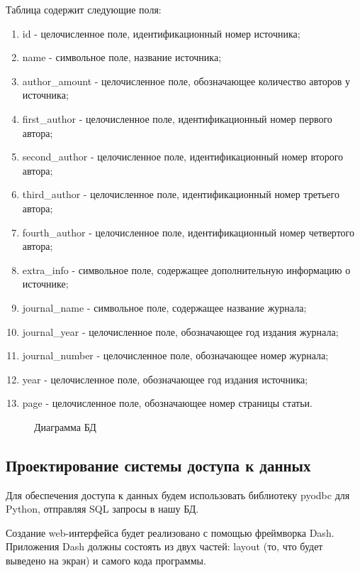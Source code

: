 Таблица содержит следующие поля:
\begin{enumerate}
	\item id - целочисленное поле, идентификационный номер источника;
	\item name - символьное поле, название источника;
	\item author\_amount - целочисленное поле, обозначающее количество авторов у источника;
	\item first\_author - целочисленное поле, идентификационный номер первого автора;
	\item second\_author - целочисленное поле, идентификационный номер второго автора;
	\item third\_author - целочисленное поле, идентификационный номер третьего автора;
	\item fourth\_author - целочисленное поле, идентификационный номер четвертого автора;
	\item extra\_info - символьное поле, содержащее дополнительную информацию о источнике;
	\item journal\_name - символьное поле, содержащее название журнала;
	\item journal\_year - целочисленное поле, обозначающее год издания журнала;
	\item journal\_number - целочисленное поле, обозначающее номер журнала;
	\item year - целочисленное поле, обозначающее год издания источника;
	\item page - целочисленное поле, обозначающее номер страницы статьи.
\end{enumerate}


\newpage
\begin{figure}[h!]
	\caption{Диаграмма БД}
	\label{fig:image1}
\end{figure}


\subsection*{Проектирование системы доступа к данных}%
Для обеспечения доступа к данных будем использовать библиотеку pyodbc для Python, отправляя SQL запросы в нашу БД. 

Создание web-интерфейса будет реализовано с помощью фреймворка Dash. Приложения Dash должны состоять из двух частей: layout (то, что будет выведено на экран) и самого кода программы.

